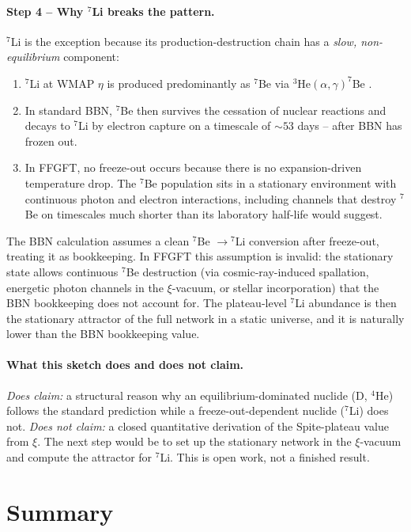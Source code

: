 \documentclass[11pt,a4paper]{article}
\begin{document}
\paragraph{Step 4 -- Why $^7$Li breaks the pattern.}
$^7$Li is the exception because its production-destruction chain has a \emph{slow, non-equilibrium} component:
\begin{enumerate}\itemsep1pt
\item $^7$Li at WMAP $\eta$ is produced predominantly as $^7$Be via $^3$He$(\alpha,\gamma)^7$Be \cite{fields2011}.
\item In standard BBN, $^7$Be then survives the cessation of nuclear reactions and decays to $^7$Li by electron capture on a timescale of $\sim 53$ days -- after BBN has frozen out.
\item In FFGFT, no freeze-out occurs because there is no expansion-driven temperature drop. The $^7$Be population sits in a stationary environment with continuous photon and electron interactions, including channels that destroy $^7$Be on timescales much shorter than its laboratory half-life would suggest.
\end{enumerate}
The BBN calculation assumes a clean $^7$Be $\to {}^7$Li conversion after freeze-out, treating it as bookkeeping. In FFGFT this assumption is invalid: the stationary state allows continuous $^7$Be destruction (via cosmic-ray-induced spallation, energetic photon channels in the $\xi$-vacuum, or stellar incorporation) that the BBN bookkeeping does not account for. The plateau-level $^7$Li abundance is then the stationary attractor of the full network in a static universe, and it is naturally lower than the BBN bookkeeping value.

\paragraph{What this sketch does and does not claim.}
\textit{Does claim:} a structural reason why an equilibrium-dominated nuclide (D, $^4$He) follows the standard prediction while a freeze-out-dependent nuclide ($^7$Li) does not. \textit{Does not claim:} a closed quantitative derivation of the Spite-plateau value from $\xi$. The next step would be to set up the stationary network in the $\xi$-vacuum and compute the attractor for $^7$Li. This is open work, not a finished result.

\section{Summary}
\end{document}
